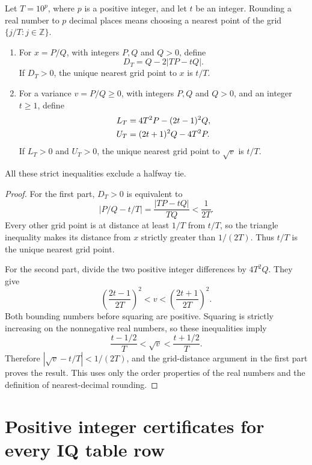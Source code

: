 \begin{lemma}
\label{lem:rounding}
Let \(T=10^p\), where \(p\) is a positive integer, and let \(t\) be an
integer. Rounding a real number to \(p\) decimal places means choosing a
nearest point of the grid \(\{j/T:j\in\mathbb Z\}\).
\begin{enumerate}
\item For \(x=P/Q\), with integers \(P,Q\) and \(Q>0\), define
\begin{equation}
 D_T=Q-2|TP-tQ|.
 \label{eq:rounding-mean-certificate}
\end{equation}
If \(D_T>0\), the unique nearest grid point to \(x\) is \(t/T\).
\item For a variance \(v=P/Q\geq0\), with integers \(P,Q\) and \(Q>0\),
and an integer \(t\geq1\), define
\begin{align}
 L_T&=4T^2P-(2t-1)^2Q,\notag\\
 U_T&=(2t+1)^2Q-4T^2P.
 \label{eq:rounding-sd-certificates}
\end{align}
If \(L_T>0\) and \(U_T>0\), the unique nearest grid point to
\(\sqrt v\) is \(t/T\).
\end{enumerate}
All these strict inequalities exclude a halfway tie.
\end{lemma}

\begin{proof}
For the first part, \(D_T>0\) is equivalent to
\[
 |P/Q-t/T|=\frac{|TP-tQ|}{TQ}<\frac1{2T}.
\]
Every other grid point is at distance at least \(1/T\) from \(t/T\), so
the triangle inequality makes its distance from \(x\) strictly greater
than \(1/(2T)\). Thus \(t/T\) is the unique nearest grid point.

For the second part, divide the two positive integer differences by
\(4T^2Q\). They give
\[
 \left(\frac{2t-1}{2T}\right)^2
     <v<
 \left(\frac{2t+1}{2T}\right)^2.
\]
Both bounding numbers before squaring are positive. Squaring is strictly
increasing on the nonnegative real numbers, so these inequalities imply
\[
 \frac{t-1/2}{T}<\sqrt v<\frac{t+1/2}{T}.
\]
Therefore \(|\sqrt v-t/T|<1/(2T)\), and the grid-distance argument in
the first part proves the result. This uses only the order properties of
the real numbers and the definition of nearest-decimal rounding.
\end{proof}

\section{Positive integer certificates for every IQ table row}


